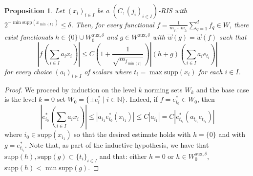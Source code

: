 \documentclass[12pt,a4paper]{amsart}
\newcommand{\N}{\mathbb{N}}
\newcommand{\bes}{\begin{equation*}}
\newcommand{\ees}{\end{equation*}}
\newcommand{\supp}{\text{supp}}
\theoremstyle{definition}
\theoremstyle{plain}
\newtheorem{proposition}[question]{Proposition}
\begin{document}
\begin{proposition}{\label{basic_inequality}}
Let $(x_{i})_{i\in I}$ be a $(C,(j_{i})_{i\in I})$-RIS with $2^{-\min\supp(x_{\min(I)})}\leq\delta$. Then, for every functional $f=\frac{1}{m_{j_{1}}\cdots m_{j_{l}}}\sum_{q=1}^{d}f_{q}\in W$, there exist functionals $h\in \{0\}\cup W^{\text{aux},\delta}_{0}$ and $g\in W^{\text{aux},\delta}$ with $\vec w(g)=\vec w(f)$ such that
\bes \left\vert f\left(\sum_{i\in I}a_{i}x_{i}\right)\right\vert \leq C\left(1+\frac{1}{\sqrt{m_{j_{\min(I)}}}}\right)\left\vert (h+g)\left(\sum_{i\in I}a_{i}e_{t_{i}}\right)\right\vert \ees
for every choice $(a_{i})_{i\in I}$ of scalars where $t_{i}=\max\supp(x_{i})$ for each $i\in I$.
\end{proposition}
\begin{proof}
We  proceed by induction on the level $k$ norming sets $W_{k}$ and the base case is the level $k=0$ set $W_{0}=\{\pm e_{i}^{*} \mid i\in\N\}$. Indeed, if $f=e^{*}_{i_{0}}\in W_{0}$, then
\bes \left\vert e^{*}_{i_{0}}\left(\sum_{i\in I}a_{i}x_{i}\right)\right\vert \leq |a_{i_{1}}e^{*}_{i_{0}}(x_{i_{1}})| \leq C|a_{i_{1}}|= C|e^{*}_{t_{i_{1}}}(a_{t_{i_{1}}}e_{t_{i_{1}}})| \ees
where $i_{0}\in\supp(x_{i_{1}})$ so that the desired estimate holds with $h=\{0\}$ and with $g=e^{*}_{t_{i_{1}}}$. Note that, as part of the inductive hypothesis, we have that $\supp(h),\supp(g)\subset\{t_{i}\}_{i\in I}$ and that: either $h=0$ or $h\in W^{\text{aux},\delta}_{0}$, $\supp(h)<\min\supp(g)$.


\end{proof}
\end{document}
